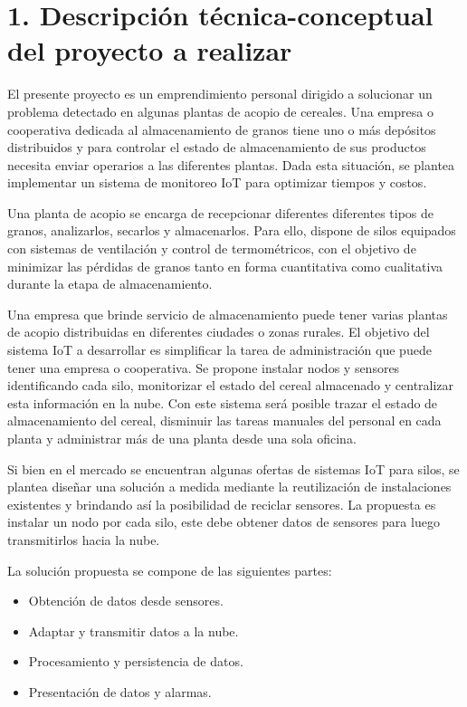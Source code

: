 \documentclass[
11pt, %
]{charter}
\begin{document}
\section{1. Descripción técnica-conceptual del proyecto a realizar}
\label{sec:descripcion}

El presente proyecto es un emprendimiento personal dirigido a solucionar un problema detectado en algunas plantas de acopio de cereales. Una empresa  o cooperativa dedicada al almacenamiento de granos tiene uno o más depósitos distribuidos y para controlar el estado de almacenamiento de sus productos necesita enviar operarios a las diferentes plantas. Dada esta situación, se plantea implementar un sistema de monitoreo IoT para optimizar tiempos y costos. 

Una planta de acopio se encarga de recepcionar diferentes diferentes tipos de granos, analizarlos, secarlos y almacenarlos. Para ello, dispone de silos equipados con sistemas de ventilación y control de termométricos, con el objetivo de minimizar las pérdidas de granos tanto en forma cuantitativa como cualitativa durante la etapa de almacenamiento. 

Una empresa que brinde servicio de almacenamiento puede tener varias plantas de acopio distribuidas en diferentes ciudades o zonas rurales. El objetivo del sistema IoT a desarrollar es simplificar la tarea de administración que puede tener una empresa o cooperativa. Se propone instalar nodos y sensores identificando cada silo, monitorizar el estado del cereal almacenado y centralizar esta información en la nube. Con este sistema será posible trazar el estado de almacenamiento del cereal, disminuir las tareas manuales del personal en cada planta y administrar más de una planta desde una sola oficina. 

Si bien en el mercado se encuentran algunas ofertas de sistemas IoT para silos, se plantea diseñar una solución a medida mediante la reutilización de instalaciones existentes y brindando así la posibilidad de reciclar sensores. La propuesta es instalar un nodo por cada silo, este debe obtener datos de sensores para luego transmitirlos hacia la nube. 

La solución propuesta se compone de las siguientes partes: 
\begin{itemize}
	\item Obtención de datos desde sensores. 
	\item Adaptar y transmitir datos a la nube.
	\item Procesamiento y persistencia de datos.
	\item Presentación de datos y alarmas. 
\end{itemize}
\end{document}
